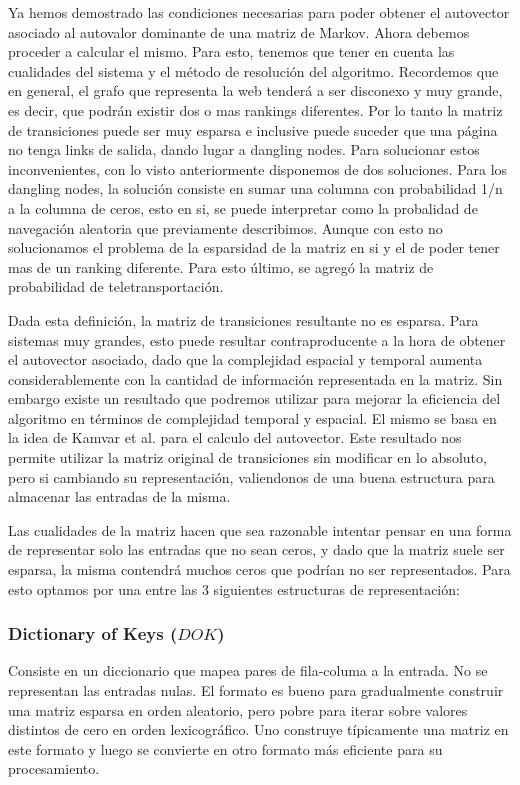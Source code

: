 Ya hemos demostrado las condiciones necesarias para poder obtener el autovector asociado al autovalor dominante de una matriz de Markov. 
Ahora debemos proceder a calcular el mismo. Para esto, tenemos que tener en cuenta las cualidades del sistema y el método de resolución del algoritmo. Recordemos que en general, el grafo que representa la web tenderá a ser disconexo y muy grande, es decir, que podrán existir dos o mas rankings diferentes. Por lo tanto la matriz 
de transiciones puede ser muy esparsa e inclusive puede suceder que una página no tenga links de salida, dando lugar a dangling nodes. Para solucionar estos inconvenientes, con lo visto anteriormente disponemos de dos soluciones. Para los dangling nodes, la solución consiste en sumar una columna con probabilidad 1/n a la columna de ceros, esto en si, se puede interpretar como la probalidad de navegación aleatoria que previamente describimos. Aunque con esto no solucionamos el problema de la esparsidad de la matriz en si y el de poder tener mas de un ranking diferente. Para esto último, se agregó la matriz de probabilidad de teletransportación.

Dada esta definición, la matriz de transiciones resultante no es esparsa. 
Para sistemas muy grandes, esto puede resultar contraproducente a la hora de obtener el autovector asociado, dado que la complejidad espacial y temporal aumenta  considerablemente con la cantidad de información representada en la matriz. Sin embargo existe un resultado que podremos utilizar para mejorar la eficiencia del algoritmo en términos de complejidad temporal y espacial. El mismo se basa en la idea de Kamvar et al. \cite[Algoritmo 1]{Kamvar2003} para el calculo del autovector. Este resultado nos permite utilizar la matriz original de transiciones sin modificar en lo absoluto, pero si cambiando su representación, valiendonos de una buena estructura para almacenar las entradas de la misma. 

Las cualidades de la matriz hacen que sea razonable intentar pensar en una forma de representar solo las entradas que no sean ceros, y dado que la matriz suele ser esparsa, la misma contendrá muchos ceros que podrían no ser representados. Para esto optamos por una entre las 3 siguientes estructuras de representación:

\subsubsection{Dictionary of Keys ($DOK$)}

Consiste en un diccionario que mapea pares de fila-columa a la entrada. No se representan las entradas nulas. El formato es bueno para gradualmente construir una matriz esparsa en orden aleatorio, pero pobre para iterar sobre valores distintos de cero en orden lexicográfico. Uno construye típicamente una matriz en este formato y luego se convierte en otro formato más eficiente para su procesamiento.

